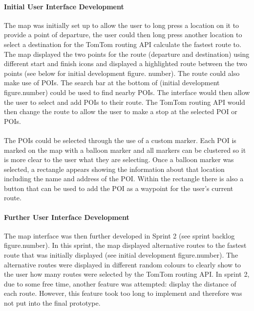 \documentclass[12pt,a4paper]{article}
\begin{document}
\paragraph{Initial User Interface Development}

 The map was initially set up to allow the user to long press a location on it to provide a point of departure, the user could then long press another location to select a destination for the TomTom routing API calculate the fastest route to. The map displayed the two points for the route (departure and destination) using different start and finish icons and displayed a highlighted route between the two points (see below for initial development figure. number). The route could also make use of POIs. The search bar at the bottom of (initial development figure.number) could be used to find nearby POIs. The interface would then allow the user to select and add POIs to their route. The TomTom routing API would then change the route to allow the user to make a stop at the selected POI or POIs.

 \paragraph{}
 The POIs could be selected through the use of a custom marker. Each POI is marked on the map with a balloon marker and all markers can be clustered so it is more clear to the user what they are selecting. Once a balloon marker was selected, a rectangle appears showing the information about that location including the name and address of the POI. Within the rectangle there is also a button that can be used to add the POI as a waypoint for the user's current route.

\paragraph{Further User Interface Development}
The map interface was then further developed in Sprint 2 (see sprint backlog figure.number). In this sprint, the map displayed alternative routes to the fastest route that was initially displayed (see initial development figure.number). The alternative routes were displayed in different random colours to clearly show to the user how many routes were selected by the TomTom routing API. In sprint 2, due to some free time, another feature was attempted: display the distance of each route. However, this feature took too long to implement and therefore was not put into the final prototype.
\end{document}
